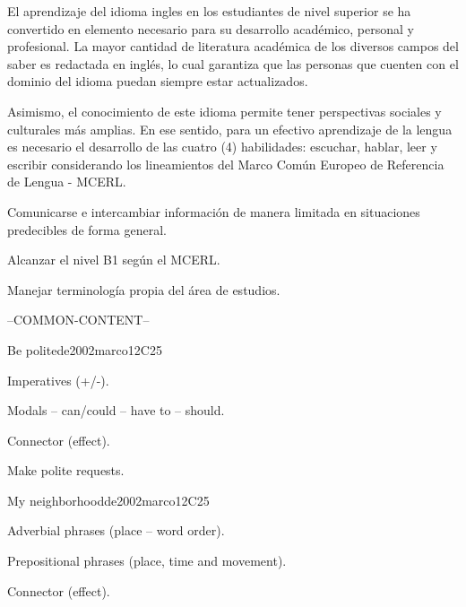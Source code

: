 \begin{syllabus}


\begin{justification}
El aprendizaje del idioma ingles en los estudiantes de nivel superior se ha 
convertido en elemento necesario para su desarrollo académico, 
personal y profesional. La mayor cantidad de literatura académica de los 
diversos campos del saber es redactada en inglés, lo cual garantiza que las 
personas que cuenten con el dominio del idioma puedan siempre estar actualizados. 

Asimismo, el conocimiento de este idioma permite tener perspectivas 
sociales y culturales más amplias. En ese sentido, para un efectivo aprendizaje 
de la lengua es necesario el desarrollo de las cuatro (4) habilidades: 
escuchar, hablar, leer y escribir considerando los lineamientos del 
Marco Común Europeo de Referencia de Lengua - MCERL.
\end{justification}

\begin{goals}
\item Comunicarse e intercambiar información de manera limitada en situaciones predecibles de forma general.
\item Alcanzar el nivel B1 según el MCERL.
\item Manejar terminología propia del área de estudios.
\end{goals}

--COMMON-CONTENT--

\begin{unit}{Be polite}{}{de2002marco}{12}{C25}
   \begin{topics}
      \item Imperatives (+/-).
      \item Modals – can/could – have to – should.
      \item Connector (effect).
   \end{topics}

   \begin{learningoutcomes}
      \item Make polite requests.
   \end{learningoutcomes}
\end{unit}

\begin{unit}{My neighborhood}{}{de2002marco}{12}{C25}
   \begin{topics}
      \item Adverbial phrases (place – word order).
      \item Prepositional phrases (place, time and movement).
      \item Connector (effect).
   \end{topics}


\end{unit}
\end{syllabus}
